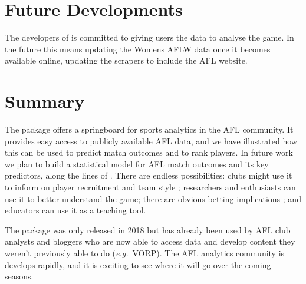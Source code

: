 \section{Future Developments}

The developers of  is committed to giving users the data to analyse the game. In the future this means updating the Womens AFLW data once it becomes available online, updating the scrapers to include the AFL website.

\section{Summary}



The  package offers a springboard for sports analytics in the AFL community. It provides easy access to publicly available AFL data, and we have illustrated how this can be used to predict match outcomes and to rank players. In future work we plan to build a statistical model for AFL match outcomes and its key predictors, along the lines of \citep{yurko2018nflwar,deshpande2016estimating}. There are endless possibilities: clubs might use it to inform on player recruitment \citep{on2010value} and team style \citep{greenham2017pilot}; researchers and enthusiasts can use it to better understand the game; there are obvious betting implications \citep{bailey2000identifying}; and educators can use it as a teaching tool.

The  package was only released in 2018 but has already been used by AFL club analysts and bloggers who are now able to access data and develop content they weren't previously able to do (\emph{e.g.}\ \href{http://www.matterofstats.com/mafl-stats-journal/2019/1/5/estimating-afl-player-value}{VORP}). The AFL analytics community is develops rapidly, and it is exciting to see where it will go over the coming seasons.







\address{Robert N. Nguyen\\
  School of Mathematics and Statistics\\
  University of New South Wales\\
  Sydney,NSW 2052 Australia\\
  }

\address{James T. Day\\
	Fusion Sport\\
   Australia\\
	}

\address{David I. Warton\\
  School of Mathematics and Statistics and\\
  Evolution \& Ecology Research Centre\\
University of New South Wales\\
Sydney,NSW 2052 Australia\\
  }

\address{Oscar Lane\\
}
